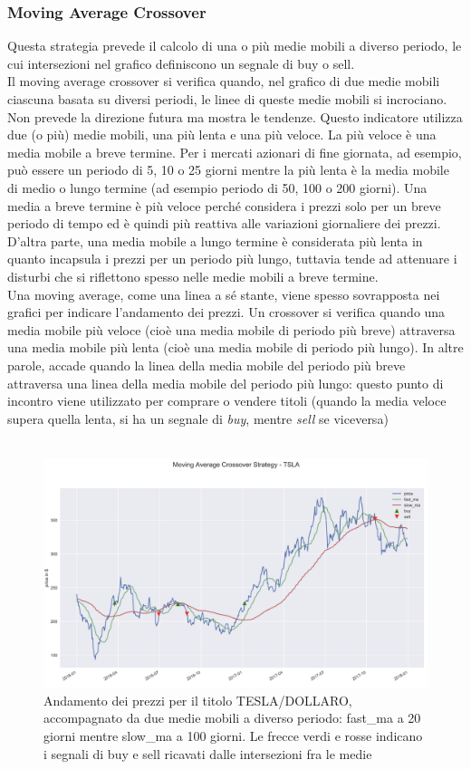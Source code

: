 \documentclass{article}
\numberwithin{equation}{section}
\begin{document}
		\subsubsection{Moving Average Crossover}
		Questa strategia prevede il calcolo di una o più medie mobili a diverso periodo, le cui intersezioni nel grafico definiscono un segnale di buy o sell.\\
		Il moving average crossover si verifica quando, nel grafico di due medie mobili ciascuna basata su diversi periodi, le linee di queste medie mobili si incrociano. Non prevede la direzione futura ma mostra le tendenze. Questo indicatore utilizza due (o più) medie mobili, una più lenta e una più veloce. La più veloce è una media mobile a breve termine. Per i mercati azionari di fine giornata, ad esempio, può essere un periodo di 5, 10 o 25 giorni mentre la più lenta è la media mobile di medio o lungo termine (ad esempio periodo di 50, 100 o 200 giorni). Una media a breve termine è più veloce perché considera i prezzi solo per un breve periodo di tempo ed è quindi più reattiva alle variazioni giornaliere dei prezzi. D'altra parte, una media mobile a lungo termine è considerata più lenta in quanto incapsula i prezzi per un periodo più lungo, tuttavia tende ad attenuare i disturbi che si riflettono spesso nelle medie mobili a breve termine.
		\\
		Una moving average, come una linea a sé stante, viene spesso sovrapposta nei grafici per indicare l'andamento dei prezzi. Un crossover si verifica quando una media mobile più veloce (cioè una media mobile di periodo più breve) attraversa una media mobile più lenta (cioè una media mobile di periodo più lungo). In altre parole, accade quando la linea della media mobile del periodo più breve attraversa una linea della media mobile del periodo più lungo: questo punto di incontro viene utilizzato per comprare o vendere titoli (quando la media veloce supera quella lenta, si ha un segnale di \textit{buy}, mentre \textit{sell} se viceversa)
		\\~\\
		\begin{figure}
		\includegraphics[width=\linewidth]{moving_avg}
		\caption{Andamento dei prezzi per il titolo TESLA/DOLLARO, accompagnato da due medie mobili a diverso periodo: fast\_ma a 20 giorni mentre slow\_ma a 100 giorni. Le frecce verdi e rosse indicano i segnali di buy e sell ricavati dalle intersezioni fra le medie}
		\end{figure}
\end{document}

